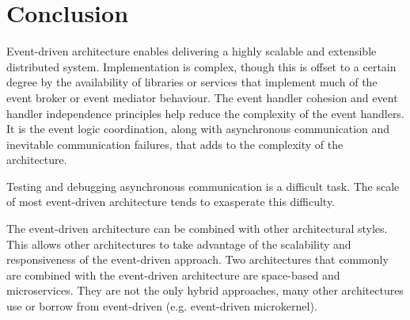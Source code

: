 \section{Conclusion}

Event-driven architecture enables delivering a highly scalable and extensible distributed system.
Implementation is complex,
though this is offset to a certain degree by the availability of libraries or services that implement much of the event broker or event mediator behaviour.
The event handler cohesion and event handler independence principles help reduce the complexity of the event handlers.
It is the event logic coordination, along with asynchronous communication and inevitable communication failures,
that adds to the complexity of the architecture.

Testing and debugging asynchronous communication is a difficult task.
The scale of most event-driven architecture tends to exasperate this difficulty.

The event-driven architecture can be combined with other architectural styles.
This allows other architectures to take advantage of the scalability and responsiveness of the event-driven approach.
Two architectures that commonly are combined with the event-driven architecture are space-based and microservices.
They are not the only hybrid approaches, many other architectures use or borrow from event-driven (e.g. event-driven microkernel).
